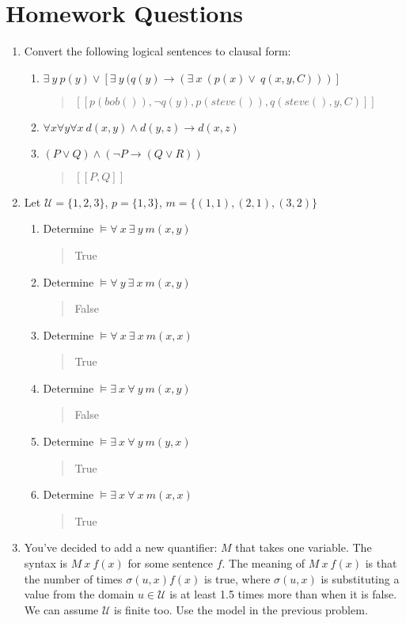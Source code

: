 \documentclass{article}
\begin{document}
\section*{Homework Questions}
\begin{enumerate}
\item Convert the following logical sentences to clausal form:
\begin{enumerate}
\item $\exists\ y\ p(y) \vee [\exists\ y\ (q(y) \rightarrow (\exists\ x\ (p(x) \vee\ q(x,y,C)))]$
\begin{quote}
$[[p(bob()), \neg q(y), p(steve()), q(steve(), y, C)]]$
\end{quote}
\item $\forall x \forall y \forall x\ d(x,y) \wedge d(y,z) \rightarrow d(x,z)$
\item $( P \vee Q) \wedge (\neg P \rightarrow (Q \vee R))$
\begin{quote}
$[[P, Q]]$
\end{quote}
\end{enumerate}
\item Let $\mathcal{U} = \{1,2,3\}$, $p = \{1,3\}$, $m = \{(1,1),(2,1),(3,2)\}$
\begin{enumerate}
\item Determine $\models \forall\ x\ \exists\ y\ m(x,y)$
\begin{quote}
True
\end{quote}
\item Determine $\models \forall\ y\ \exists\ x\ m(x,y)$
\begin{quote}
False
\end{quote}
\item Determine $\models \forall\ x\ \exists\ x\ m(x,x)$
\begin{quote}
True
\end{quote}
\item Determine $\models \exists \ x\ \forall\ y\ m(x,y)$
\begin{quote}
False
\end{quote}
\item Determine $\models \exists \ x\ \forall\ y\ m(y,x)$
\begin{quote}
True
\end{quote}
\item Determine $\models \exists \ x\ \forall\ x\ m(x,x)$
\begin{quote}
True
\end{quote}
\end{enumerate}
\item You've decided to add a new quantifier: $M$ that takes one variable.  The syntax is $M\ x\ f(x)$ for some sentence $f$.  The meaning of $M\ x\ f(x)$ is that the number of times $\sigma(u,x) f(x)$ is true, where $\sigma(u,x)$ is substituting a value from the domain $u \in \mathcal{U}$ is at least 1.5 times more than when it is false.  We can assume $\mathcal{U}$ is finite too.  Use the model in the previous problem.

\end{enumerate}
\end{document}
